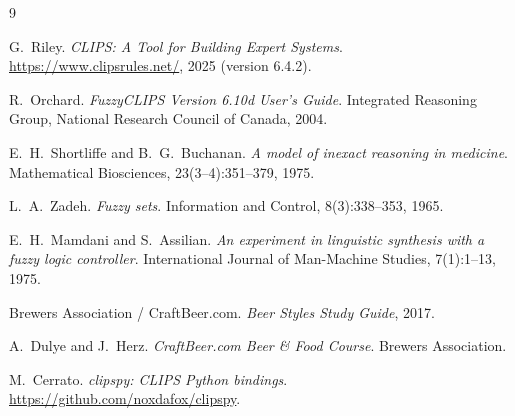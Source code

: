 \renewcommand{\bibname}{References}

\begin{thebibliography}{9}

 G.~Riley. \emph{CLIPS: A Tool for Building Expert Systems}.
\url{https://www.clipsrules.net/}, 2025 (version 6.4.2).

 R.~Orchard. \emph{FuzzyCLIPS Version 6.10d User's Guide}.
Integrated Reasoning Group, National Research Council of Canada, 2004.

 E.~H.~Shortliffe and B.~G.~Buchanan. \emph{A model of inexact
reasoning in medicine}. Mathematical Biosciences, 23(3--4):351--379, 1975.

 L.~A.~Zadeh. \emph{Fuzzy sets}. Information and Control,
8(3):338--353, 1965.

 E.~H.~Mamdani and S.~Assilian. \emph{An experiment in
linguistic synthesis with a fuzzy logic controller}. International Journal of
Man-Machine Studies, 7(1):1--13, 1975.

 Brewers Association / CraftBeer.com.
\emph{Beer Styles Study Guide}, 2017.

 A.~Dulye and J.~Herz. \emph{CraftBeer.com Beer \& Food
Course}. Brewers Association.

 M.~Cerrato. \emph{clipspy: CLIPS Python bindings}.
\url{https://github.com/noxdafox/clipspy}.

\end{thebibliography}
